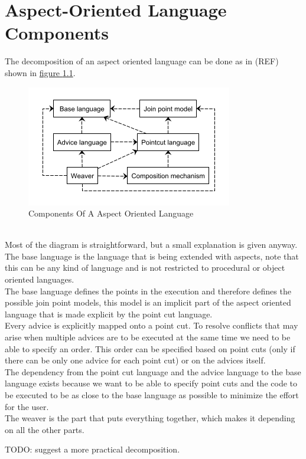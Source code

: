 \documentclass[a4paper]{report}
\begin{document}
\chapter{Aspect-Oriented Language Components}
The decomposition of an aspect oriented language can be done as in (REF) shown in \hyperref[fig:AOL_Components]{figure \ref*{fig:AOL_Components}}.
\begin{figure}[h!]
\centering
\includegraphics[scale=1]{images/AOL_Components.png}
\caption{Components Of A Aspect Oriented Language}
\label{fig:AOL_Components}
\end{figure}\\
Most of the diagram is straightforward, but a small explanation is given anyway. The base language is the language that is being extended with aspects, note that this can be any kind of language and is not restricted to procedural or object oriented languages.\\
The base language defines the points in the execution and therefore defines the possible join point models, this model is an implicit part of the aspect oriented language that is made explicit by the point cut language.\\
Every advice is explicitly mapped onto a point cut. To resolve conflicts that may arise when multiple advices are to be executed at the same time we need to be able to specify an order. This order can be specified based on point cuts (only if there can be only one advice for each point cut) or on the advices itself.\\
The dependency from the point cut language and the advice language to the base language exists because we want to be able to specify point cuts and the code to be executed to be as close to the base language as possible to minimize the effort for the user.\\
The weaver is the part that puts everything together, which makes it depending on all the other parts.

TODO: suggest a more practical decomposition.
\end{document}

